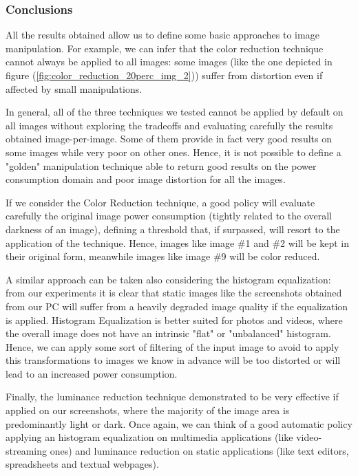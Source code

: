 \documentclass[a4paper]{article}
\begin{document}
        \subsubsection{Conclusions}
        All the results obtained allow us to define some basic approaches to image manipulation. For example, we can infer that the color reduction technique cannot always be applied to all images: some images (like the one depicted in figure (\ref{fig:color_reduction_20perc_img_2})) suffer from distortion even if affected by small manipulations.
        
        In general, all of the three techniques we tested cannot be applied by default on all images without exploring the tradeoffs and evaluating carefully the results obtained image-per-image. Some of them provide in fact very good results on some images while very poor on other ones.
        Hence, it is not possible to define a "golden" manipulation technique able to return good results on the power consumption domain and poor image distortion for all the images.
        
        If we consider the Color Reduction technique, a good policy will evaluate carefully the original image power consumption (tightly related to the overall darkness of an image), defining a threshold that, if surpassed, will resort to the application of the technique. Hence, images like image \#1 and \#2 will be kept in their original form, meanwhile images like image \#9 will be color reduced.

        A similar approach can be taken also considering the histogram equalization: from our experiments it is clear that static images like the screenshots obtained from our PC will suffer from a heavily degraded image quality if the equalization is applied. Histogram Equalization is better suited for photos and videos, where the overall image does not have an intrinsic "flat" or "unbalanced" histogram. Hence, we can apply some sort of filtering of the input image to avoid to apply this transformations to images we know in advance will be too distorted or will lead to an increased power consumption.

        Finally, the luminance reduction technique demonstrated to be very effective if applied on our screenshots, where the majority of the image area is predominantly light or dark.
        Once again, we can think of a good automatic policy applying an histogram equalization on multimedia applications (like video-streaming ones) and luminance reduction on static applications (like text editors, spreadsheets and textual webpages).
\end{document}
